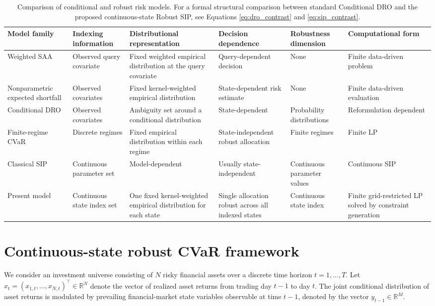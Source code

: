\documentclass[smallextended]{svjour3}
\begin{document}
\begin{table}[htbp]
\centering
\caption{Comparison of conditional and robust risk models. For a formal structural comparison between standard Conditional DRO and the proposed continuous-state Robust SIP, see Equations \eqref{eq:dro_contrast} and \eqref{eq:sip_contrast}.}
\label{tab:lit_comparison}
\begin{adjustbox}{max width=\textwidth}
\begin{tabular}{llllll}
\toprule
\textbf{Model family} & \textbf{Indexing information} & \textbf{Distributional representation} & \textbf{Decision dependence} & \textbf{Robustness dimension} & \textbf{Computational form} \\
\midrule
Weighted SAA & Observed query covariate & Fixed weighted empirical
distribution at the query covariate & Query-dependent decision
& None & Finite data-driven problem \\
Nonparametric expected shortfall & Observed covariates & Fixed kernel-weighted empirical distribution & State-dependent risk estimate & None & Finite data-driven evaluation \\
Conditional DRO & Observed covariates & Ambiguity set around a conditional distribution & State-dependent & Probability distributions & Reformulation dependent \\
Finite-regime CVaR & Discrete regimes & Fixed empirical distribution within each regime & State-independent robust allocation & Finite regimes & Finite LP \\
Classical SIP & Continuous parameter set & Model-dependent & Usually state-independent & Continuous parameter values & Continuous SIP \\
Present model & Continuous state index set & One fixed kernel-weighted
empirical distribution for each state & Single allocation robust across all
indexed states & Continuous state index & Finite grid-restricted LP
solved by constraint generation \\
\bottomrule
\end{tabular}
\end{adjustbox}
\end{table}




\section{Continuous-state robust CVaR framework}
We consider an investment universe consisting of $N$ risky financial assets over a discrete time horizon $t = 1, \dots, T$. Let $x_t = (x_{1,t}, \dots, x_{N,t})^\top \in \mathbb{R}^N$ denote the vector of realized asset returns from trading day $t-1$ to day $t$. The joint conditional distribution of asset returns is modulated by prevailing financial-market state variables observable at time $t-1$, denoted by the vector $y_{t-1} \in \mathbb{R}^M$.
\end{document}
